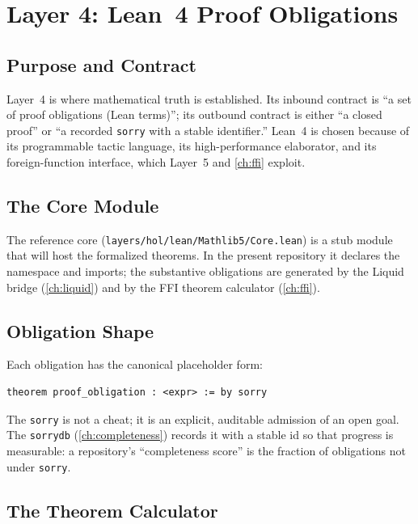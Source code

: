 \chapter{Layer 4: Lean~4 Proof Obligations}
\label{ch:lean}

\section{Purpose and Contract}
\label{sec:lean-purpose}

Layer~4 is where mathematical truth is established. Its inbound contract is
``a set of proof obligations (Lean terms)''; its outbound contract is either
``a closed proof'' or ``a recorded \texttt{sorry} with a stable identifier.''
Lean~4 is chosen because of its programmable tactic language, its
high-performance elaborator, and its foreign-function interface, which Layer~5
and \cref{ch:ffi} exploit.

\section{The Core Module}
\label{sec:lean-core}

The reference core (\texttt{layers/hol/lean/Mathlib5/Core.lean}) is a stub
module that will host the formalized theorems. In the present repository it
declares the namespace and imports; the substantive obligations are generated
by the Liquid bridge (\cref{ch:liquid}) and by the FFI theorem calculator
(\cref{ch:ffi}).

\section{Obligation Shape}
\label{sec:lean-obl}

Each obligation has the canonical placeholder form:
\begin{lstlisting}[language=Lean4,caption={Generated obligation shape.},label=lst:lean-obl]
theorem proof_obligation : <expr> := by sorry
\end{lstlisting}
The \texttt{sorry} is not a cheat; it is an explicit, auditable admission of
an open goal. The \texttt{sorrydb} (\cref{ch:completeness}) records it with a
stable id so that progress is measurable: a repository's ``completeness
score'' is the fraction of obligations not under \texttt{sorry}.

\section{The Theorem Calculator}
\label{sec:lean-calc}

